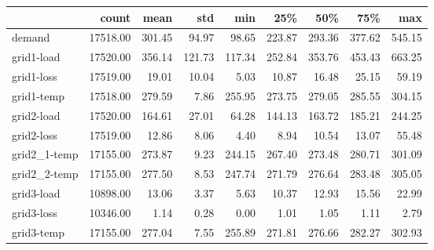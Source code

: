 \begin{tabular}{lrrrrrrrr}
\toprule
{} &    count &   mean &    std &    min &    25\% &    50\% &    75\% &    max \\
\midrule
demand       & 17518.00 & 301.45 &  94.97 &  98.65 & 223.87 & 293.36 & 377.62 & 545.15 \\
grid1-load   & 17520.00 & 356.14 & 121.73 & 117.34 & 252.84 & 353.76 & 453.43 & 663.25 \\
grid1-loss   & 17519.00 &  19.01 &  10.04 &   5.03 &  10.87 &  16.48 &  25.15 &  59.19 \\
grid1-temp   & 17518.00 & 279.59 &   7.86 & 255.95 & 273.75 & 279.05 & 285.55 & 304.15 \\
grid2-load   & 17520.00 & 164.61 &  27.01 &  64.28 & 144.13 & 163.72 & 185.21 & 244.25 \\
grid2-loss   & 17519.00 &  12.86 &   8.06 &   4.40 &   8.94 &  10.54 &  13.07 &  55.48 \\
grid2\_1-temp & 17155.00 & 273.87 &   9.23 & 244.15 & 267.40 & 273.48 & 280.71 & 301.09 \\
grid2\_2-temp & 17155.00 & 277.50 &   8.53 & 247.74 & 271.79 & 276.64 & 283.48 & 305.05 \\
grid3-load   & 10898.00 &  13.06 &   3.37 &   5.63 &  10.37 &  12.93 &  15.56 &  22.99 \\
grid3-loss   & 10346.00 &   1.14 &   0.28 &   0.00 &   1.01 &   1.05 &   1.11 &   2.79 \\
grid3-temp   & 17155.00 & 277.04 &   7.55 & 255.89 & 271.81 & 276.66 & 282.27 & 302.93 \\
\bottomrule
\end{tabular}
